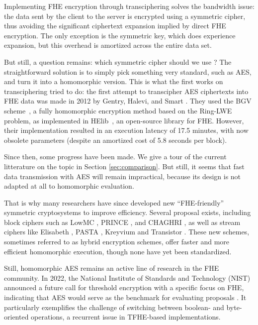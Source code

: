 Implementing FHE encryption through transciphering solves the bandwidth issue: the data sent by the client to the server is encrypted using a symmetric cipher, thus avoiding the significant ciphertext 
expansion implied by direct FHE encryption. The only exception is the symmetric key, which does experience expansion, but this overhead is amortized across the entire data set.

But still, a question remains: which symmetric cipher should we use ? The straightforward solution is to simply pick something very standard, such as AES, and turn it into a homomorphic version. This is what the first works on transciphering tried to do: the first attempt to transcipher AES ciphertexts into FHE data was made in 2012 by Gentry, Halevi, and Smart \cite{C:GenHalSma12}. They used the BGV scheme~\cite{ITCS:BraGenVai12}, a fully homomorphic encryption method based on the Ring-LWE problem, as implemented in HElib~\cite{EPRINT:HalSho20}, an open-source library for FHE. However, their implementation resulted in an execution latency of 17.5 minutes, with now obsolete parameters (despite an amortized cost of 5.8 seconds per block).

Since then, some progress have been made. We give a tour of the current litterature on the topic in Section \ref{sec:comparison}. But still, it seems that fast data transmission with AES will remain impractical, because its design is not adapted at all to homomorphic evaluation.


That is why many researchers have since developed new ``FHE-friendly'' symmetric cryptosystems to improve efficiency. Several proposal exists, including block ciphers such as LowMC \cite{EC:ARSTZ15}, PRINCE \cite{AC:BCGKKK12}, and CHAGHRI \cite{CCS:AshMahTop22}, as well as stream ciphers like Elisabeth \cite{AC:CHMS22}, PASTA \cite{TCHES:DGHRSW23}, Kreyvium \cite{FSE:CCFLNP16} and Transistor \cite{EPRINT:BBBBCL25}. These new schemes, sometimes referred to as hybrid encryption schemes, offer faster and more efficient homomorphic execution, though none have yet been standardized.


Still, homomorphic AES remains an active line of research in the FHE community. In 2022, the National Institute of Standards and Technology (NIST) announced a future call for threshold encryption with a specific focus on FHE, indicating that AES would serve as the benchmark for evaluating proposals \cite{call_nist}. It particularly exemplifies the challenge of switching between boolean- and byte-oriented operations, a recurrent issue in TFHE-based implementations.



